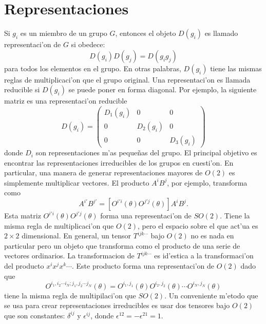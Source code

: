 \section{Representaciones}
Si $g_i$ es un miembro de un grupo $G$, entonces el objeto $D(g_i)$ es llamado representaci'on de $G$ si obedece:
\begin{equation}
D(g_i)D(g_j)=D(g_ig_j)
\end{equation}
para todos los elementos en el grupo. En otras palabras, $D(g_i)$ tiene las mismas reglas de multiplicaci'on  que el grupo original.
Una representaci'on es llamada reducible si $D(g_i)$ se puede poner en forma diagonal. Por ejemplo, la siguiente matriz es una representaci'on reducible
\begin{equation}
D(g_{i})=\begin{pmatrix}D_{1}(g_{i}) & 0 & 0\\
0 & D_{2}(g_{i}) & 0\\
0 & 0 & D_{3}(g_{i})
\end{pmatrix}
\end{equation}
donde $D_i$ son representaciones m'as peque\~nas del grupo.
El principal objetivo es encontrar las representaciones irreducibles de los grupos en cuesti'on. 
En particular, una manera de generar representaciones mayores de $O(2)$ es simplemente multiplicar vectores. El producto $A^iB^j$, por ejemplo, transforma como
\begin{equation}
A^{i\prime}B^{j\prime}=\left[O^{i\prime i}(\theta)O^{j\prime j}(\theta)\right]A^iB^j.
\end{equation}
Esta matriz $O^{i\prime i}(\theta)O^{j\prime j}(\theta)$ forma una representaci'on de  $SO(2)$. Tiene la misma regla de multiplicaci'on que $O(2)$, pero el espacio sobre el que act'ua es $2\times 2$ dimensional.
En general, un tensor $T^{ijk\cdots}$ bajo $O(2)$ no es nada en particular pero un objeto que transforma como el producto de una serie de vectores ordinarios.
La transformacion de $T^{ijk\cdots}$ es id'estica a la transformaci'on del producto $x^ix^jx^k\cdots.$ Este producto forma una representaci'on de $O(2)$ dado que
\begin{equation}
O^{i_1,i_2\cdots i_N;j_1,j_2\cdots j_N}(\theta)=O^{i_1,j_1}(\theta)O^{i_2,j_2}(\theta)\cdots O^{i_N,j_N}(\theta)
\end{equation}
tiene la misma regla de multipilaci'on que $SO(2)$.
Un conveniente m'etodo que se usa para crear representaciones irreducibles es usar dos tensores bajo $O(2)$ que son constantes: $\delta^{ij}$ y $\epsilon^{ij}$, donde $\epsilon^{12}=-\epsilon^{21}=1$.
